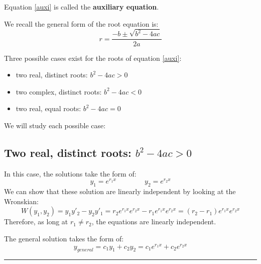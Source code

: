 Equation \eqref{auxi} is called the \textbf{auxiliary equation}.

We recall the general form of the root equation is:
\begin{equation*}
r=\frac{-b\pm \sqrt{b^2-4ac}}{2a}
\end{equation*}

Three possible cases exist for the roots of equation \eqref{auxi}:
\begin{itemize}
\item two real, distinct roots: $b^2-4ac>0$
\item two complex, distinct roots: $b^2-4ac<0$
\item two real, equal roots: $b^2-4ac=0$
\end{itemize}

We will study each possible case:
\subsection{Two real, distinct roots: $b^2-4ac>0$}
In this case, the solutions take the form of:
\begin{equation*}
y_1=e^{r_1x} \qquad \qquad y_2=e^{r_2x}
\end{equation*}
We can show that these solution are linearly independent by looking at the Wronskian:
\begin{equation*}
W(y_1,y_2)=y_1y'_2-y_2y'_1=r_2 e^{r_1x}e^{r_2x}-r_1 e^{r_1x}e^{r_2x}=(r_2-r_1) e^{r_1x}e^{r_2x}
\end{equation*}
Therefore, as long at $r_1\neq r_2$, the equations are linearly independent.

The general solution takes the form of:
\begin{equation*}
\boxed{y_{general}=c_1y_1+c_2y_2=c_1e^{r_1x}+c_2e^{r_2x}}
\end{equation*}

\begin{center}
\noindent\rule{4cm}{0.4pt}
\end{center}

